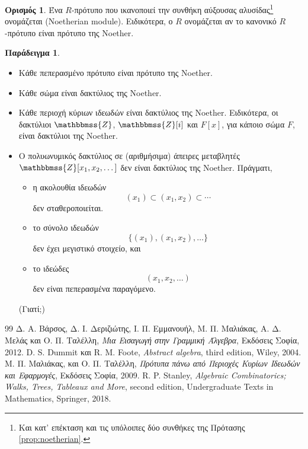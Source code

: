 \documentclass[12pt,a4paper,reqno]{amsart}
\theoremstyle{definition}
\newtheorem{definition}[theorem]{Ορισμός}
\newtheorem{example}[theorem]{Παράδειγμα}
\theoremstyle{remark}
\numberwithin{theorem}{section}
\numberwithin{exercise}{section}
\numberwithin{equation}{section}
\newcommand{\ZZ}{\mathbbmss{Z}}
\newcommand{\defn}[1]{{\color{mylightblue}{#1}}}
\begin{document}
\begin{definition}
    \label{def:noetherian}
    Ένα $R$-πρότυπο που ικανοποιεί την συνθήκη αύξουσας αλυσίδας\footnote{Και κατ' επέκταση και τις υπόλοιπες δύο συνθήκες της Πρότασης \ref{prop:noetherian}.} ονομάζεται \defn{πρότυπο της Noether} (Noetherian module). Ειδικότερα, ο $R$ ονομάζεται \defn{δακτύλιος της Noether} αν το κανονικό $R$-πρότυπο είναι πρότυπο της Noether.
\end{definition}

\begin{example}
    \label{ex:noetherian}
    \leavevmode
    \begin{itemize}
        \item[(α)] Κάθε πεπερασμένο πρότυπο είναι πρότυπο της Noether.
        \item[(β)] Κάθε σώμα είναι δακτύλιος της Noether.
        \item[(γ)] Κάθε περιοχή κύριων ιδεωδών είναι δακτύλιος της Noether. Ειδικότερα, οι δακτύλιοι $\ZZ$, $\ZZ[i]$ και $F[x]$, για κάποιο σώμα $F$, είναι δακτύλιοι της Noether.
        \item[(δ)] Ο πολυωνυμικός δακτύλιος σε (αριθμήσιμα) άπειρες μεταβλητές $\ZZ[x_1, x_2, \dots]$ δεν είναι δακτύλιος της Noether. Πράγματι,
        \begin{itemize} 
            \item η ακολουθία ιδεωδών 
            \[
            (x_1) \subset (x_1, x_2) \subset \cdots 
            \]
            δεν σταθεροποιείται.
            \item το σύνολο ιδεωδών 
            \[
            \{(x_1), (x_1, x_2), \dots \}
            \]
            δεν έχει μεγιστικό στοιχείο, και 
            \item το ιδεώδες 
            \[
            (x_1, x_2, \dots)
            \]
            δεν είναι πεπερασμένα παραγόμενο.
        \end{itemize}
        (Γιατί;)
    \end{itemize}
\end{example}


\begin{thebibliography}{99}
    Δ. Α. Βάρσος, Δ. Ι. Δεριζιώτης, Ι. Π. Εμμανουήλ, Μ. Π. Μαλιάκας, Α. Δ. Μελάς και Ο. Π. Ταλέλλη, 
    \emph{Μια Εισαγωγή στην Γραμμική Άλγεβρα}, 
    Εκδόσεις Σοφία, 2012.
    D. S. Dummit και R. M. Foote, 
    \textit{Abstract algebra},
    third edition, Wiley, 2004. 
    Μ. Π. Μαλιάκας, και Ο. Π. Ταλέλλη, 
    \emph{Πρότυπα πάνω από Περιοχές Κυρίων Ιδεωδών και Εφαρμογές}, 
    Εκδόσεις Σοφία, 2009.
    R. P. Stanley,
    \emph{Algebraic Combinatorics; Walks, Trees, Tableaux and More},
    second edition, Undergraduate Texts in Mathematics, Springer, 2018.
\end{thebibliography}
\end{document}
